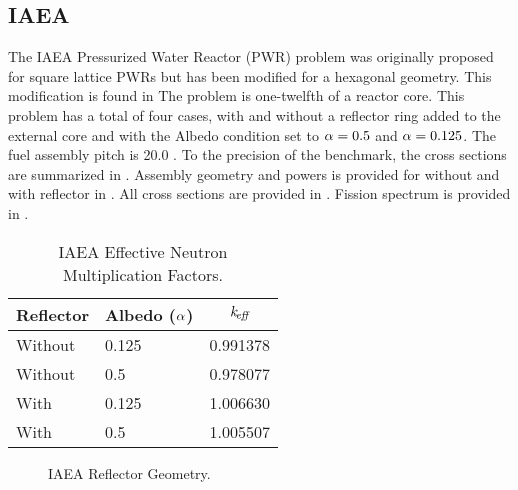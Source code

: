   \subsection{IAEA}
    \label{sec:iaea}
    The IAEA Pressurized Water Reactor (PWR) problem was originally proposed for
    square lattice PWRs but has been modified for a hexagonal geometry. This
    modification is found in \cite{chao} The problem is one-twelfth of a reactor
    core. This problem has a total of four cases, with and without a reflector
    ring added to the external core and with the Albedo condition set to
    $\alpha = 0.5$ and $\alpha = 0.125$. The fuel assembly pitch is 20.0
    . To the precision of the benchmark, the cross sections are
    summarized in .
    Assembly geometry and powers is provided for without and with 
    reflector in . All cross sections are provided in 
    . Fission spectrum is provided in .
    \begin{table}
      \caption{IAEA Effective Neutron Multiplication Factors.}
      \label{tab:iaeakeff}
      \begin{center}
        \begin{tabular}{llc}
          \toprule
          Reflector & Albedo ($\alpha$) & $k_{\!\mbox{\scriptsize \em eff}}$ \\
          \midrule
          Without & 0.125 & 0.991378 \\
          Without & 0.5   & 0.978077 \\
          With    & 0.125 & 1.006630 \\
          With    & 0.5   & 1.005507 \\
          \bottomrule
        \end{tabular}
      \end{center}
    \end{table}
    \begin{figure}
      \centering
      \vspace{0.2in}
      \caption{IAEA Reflector Geometry.}
      \label{fig:iaea_geom}
    \end{figure}
